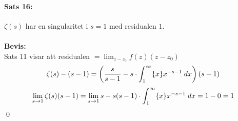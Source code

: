 \documentclass{article}%
\DeclarePairedDelimiter{\fpart} { \{ } { \} }
\begin{document}
\paragraph{Sats 16:} $\zeta(s)$ har en singularitet i $s = 1$ med residualen $1$.\\
\\
{\bf Bevis:}\\
Sats 11 visar att residualen $= \lim_{z - z_0} f(z)(z - z_0)$
\[
	\zeta(s) - (s - 1) = \left (
		\frac {s} {s - 1} - s \cdot \int_1^\infty \fpart{x} x^{-s - 1} \; dx 
	\right )
	(s - 1)
\]
\[
	\lim_{s \to 1} \zeta(s)(s - 1) = \lim_{s \to 1} s - s (s - 1) \cdot \int_1^\infty \fpart{x} x^{-s - 1} \; dx =
		1 - 0 = 1
\]
\hfill \qed
\end{document}
